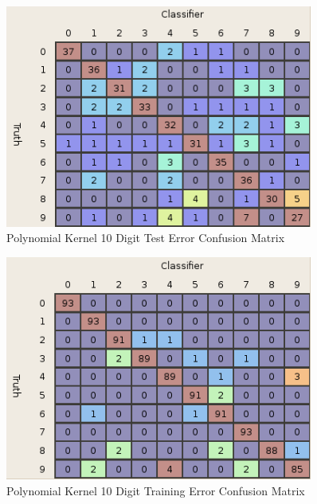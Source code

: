 \documentclass{article}
\begin{document}
\begin{figure}
\centering
\includegraphics[width=0.9\textwidth]{images/poly_all_confusion_test.png}
\caption{Polynomial Kernel 10 Digit Test Error Confusion Matrix}
\label{poly10testconfusion}
\end{figure}

\begin{figure}
\centering
\includegraphics[width=0.9\textwidth]{images/poly_all_confusion_training.png}
\caption{Polynomial Kernel 10 Digit Training Error Confusion Matrix}
\label{poly10trainconfusion}
\end{figure}
\end{document}
